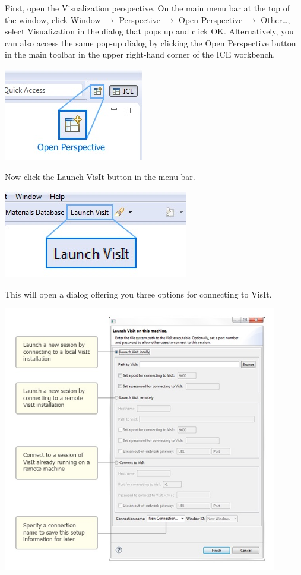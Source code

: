 \documentclass{article}
\begin{document}
First, open the Visualization perspective. On the main menu bar at the top of
the window, click Window $\rightarrow$ Perspective $\rightarrow$ Open
Perspective $\rightarrow$ Other\ldots, select Visualization in the dialog that pops up and click OK.
Alternatively, you can also access the same pop-up dialog by clicking the Open Perspective button in
the main toolbar in the upper right-hand corner of the ICE workbench. 

\begin{center}
\includegraphics{images/ICE_OpenPerspective}
\end{center}

Now click the Launch VisIt button in the menu bar.

\begin{center}
\includegraphics{images/ICE_VisItLaunchButton}
\end{center}

This will open a dialog offering you three options for connecting to VisIt.

\begin{center}
\includegraphics[width=12cm]{images/ICE_VisItLaunchOptions}
\end{center}
\end{document}
